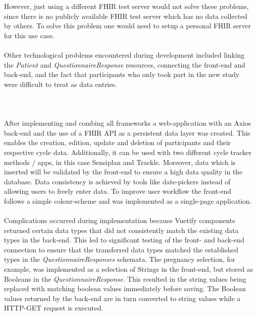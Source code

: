 \documentclass[
a4paper,
11pt
]{article}
\begin{document}
	However, just using a different \ac{FHIR} test server would not solve these problems, since there is no publicly available \ac{FHIR} test server which has no data collected by others. To solve this problem one would need to setup a personal \ac{FHIR} server for this use case.
	\\
	\\%
	Other technological problems encountered during development included linking the \textit{Patient} and \textit{QuestionnaireResponse} resources, connecting the front-end and back-end, and the fact that participants who only took part in the new study were difficult to treat as data entries.
	\\
	\\%
	\\
	\\%
	After implementing and combing all frameworks a web-application with an Axios back-end and the use of a \ac{FHIR} \ac{API} as a persistent data layer was created. This enables the creation, edition, update and deletion of participants and their respective cycle data. Additionally, it can be used with two different cycle tracker methods / apps, in this case Sensiplan\textsuperscript{\textcopyright} and Trackle. Moreover, data which is inserted will be validated by the front-end to ensure a high data quality in the database. Data consistency is achieved by tools like date-pickers instead of allowing users to freely enter data. To improve user workflow the front-end follows a simple colour-scheme and was implemented as a single-page application.
	\\
	\\%
	Complications occurred during implementation because Vuetify components returned certain data types that did not consistently match the existing data types in the back-end. This led to significant testing of the front- and back-end connection to ensure that the transferred data types matched the established types in the \textit{QuestionnaireResponses} schemata. The pregnancy selection, for example, was implemented as a selection of Strings in the front-end, but stored as Booleans in the \textit{QuestionnaireResponse}. This resulted in the string values being replaced with matching boolean values immediately before saving. The Boolean values returned by the back-end are in turn converted to string values while a \ac{HTTP}-GET request is executed.
	\\
\end{document}
